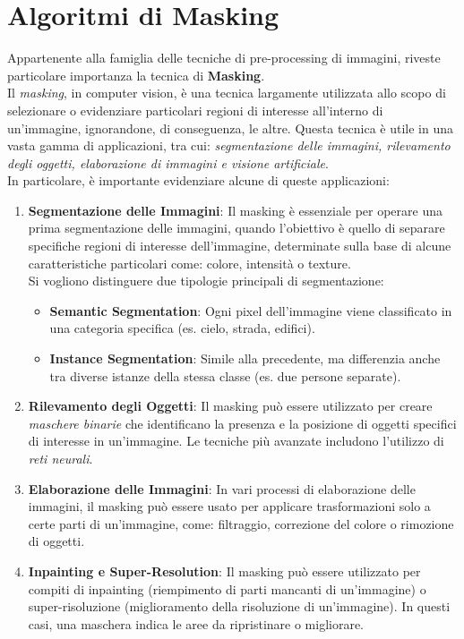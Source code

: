 \documentclass[12pt,a4paper,openright,twoside]{book}
\begin{document}
\chapter{Algoritmi di Masking}
Appartenente alla famiglia delle tecniche di pre-processing di immagini, riveste particolare importanza la tecnica di \textbf{Masking}. \\
Il {\itshape masking}, in computer vision, è una tecnica largamente utilizzata allo scopo di selezionare o evidenziare particolari regioni di interesse all'interno di un'immagine, ignorandone, di conseguenza, le altre. Questa tecnica è utile in una vasta gamma di applicazioni, tra cui: {\itshape segmentazione delle immagini, rilevamento degli oggetti, elaborazione di immagini e visione artificiale}.\\
In particolare, è importante evidenziare alcune di queste applicazioni: 
\begin{enumerate}
\item \textbf{Segmentazione delle Immagini}:
Il masking è essenziale per operare una prima segmentazione delle immagini, quando l'obiettivo è quello di separare specifiche regioni di interesse dell'immagine, determinate sulla base di alcune caratteristiche particolari come: colore, intensità o texture. \\
Si vogliono distinguere due tipologie principali di segmentazione:
\begin{itemize}
\item \textbf{Semantic Segmentation}: Ogni pixel dell'immagine viene classificato in una categoria specifica (es. cielo, strada, edifici).
\item \textbf{Instance Segmentation}: Simile alla precedente, ma differenzia anche tra diverse istanze della stessa classe (es. due persone separate).
\end{itemize}

\item \textbf{Rilevamento degli Oggetti}:
Il masking può essere utilizzato per creare {\itshape maschere binarie} che identificano la presenza e la posizione di oggetti specifici di interesse in un'immagine. Le tecniche più avanzate includono l'utilizzo di {\itshape reti neurali}.

\item \textbf{Elaborazione delle Immagini}:
In vari processi di elaborazione delle immagini, il masking può essere usato per applicare trasformazioni solo a certe parti di un'immagine, come: filtraggio, correzione del colore o rimozione di oggetti.

\item \textbf{Inpainting e Super-Resolution}:
Il masking può essere utilizzato per compiti di inpainting (riempimento di parti mancanti di un'immagine) o super-risoluzione (miglioramento della risoluzione di un'immagine). In questi casi, una maschera indica le aree da ripristinare o migliorare.
\end{enumerate}
\end{document}

